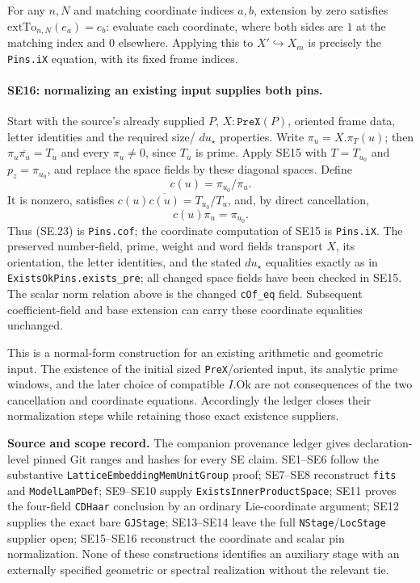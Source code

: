For any $n,N$ and matching coordinate indices $a,b$, extension by
zero satisfies $\mathrm{extTo}_{n,N}(e_a)=e_b$: evaluate each
coordinate, where both sides are $1$ at the matching index and $0$
elsewhere. Applying this to $X'\hookrightarrow X_m$ is precisely
the \texttt{Pins.iX} equation, with its fixed frame indices.

\paragraph{SE16: normalizing an existing input supplies both pins.}
Start with the source's already supplied $P$, $X:\texttt{PreX}(P)$,
oriented frame data, letter identities and the required size/
$du_\star$ properties. Write $\pi_u=X.\pi_T(u)$; then
$\pi_u\overline{\pi_u}=T_u$ and every $\pi_u\ne0$, since $T_u$
is prime. Apply SE15 with $T=T_{u_0}$ and $p_z=\pi_{u_0}$, and
replace the space fields by these diagonal spaces. Define
\[
 c(u)=\pi_{u_0}/\pi_u.
 \tag{SE.22}
\]
It is nonzero, satisfies
$c(u)\overline{c(u)}=T_{u_0}/T_u$, and, by direct cancellation,
\[
 c(u)\pi_u=\pi_{u_0}.
 \tag{SE.23}
\]
Thus (SE.23) is \texttt{Pins.cof}; the coordinate computation of
SE15 is \texttt{Pins.iX}. The preserved number-field, prime, weight
and word fields transport $X$, its orientation, the letter identities,
and the stated $du_\star$ equalities exactly as in
\texttt{ExistsOkPins.exists\_pre}; all changed space fields have
been checked in SE15. The scalar norm relation above is the changed
\texttt{cOf\_eq} field. Subsequent coefficient-field and base
extension can carry these coordinate equalities unchanged.

This is a normal-form construction for an existing arithmetic and
geometric input. The existence of the initial sized
\texttt{PreX}/oriented input, its analytic prime windows, and the
later choice of compatible $I.\mathrm{Ok}$ are not consequences of
the two cancellation and coordinate equations. Accordingly the
ledger closes their normalization steps while retaining those exact
existence suppliers.

\medskip
\noindent\textbf{Source and scope record.}
The companion provenance ledger gives declaration-level pinned Git
ranges and hashes for every SE claim. SE1--SE6 follow the substantive
\texttt{LatticeEmbeddingMemUnitGroup} proof; SE7--SE8 reconstruct
\texttt{fits} and \texttt{ModelLamPDef}; SE9--SE10 supply
\texttt{ExistsInnerProductSpace}; SE11 proves the four-field
\texttt{CDHaar} conclusion by an ordinary Lie-coordinate argument;
SE12 supplies the exact bare \texttt{GJStage}; SE13--SE14 leave the
full \texttt{NStage}/\texttt{LocStage} supplier open; SE15--SE16
reconstruct the coordinate and scalar pin normalization. None of
these constructions identifies an auxiliary stage with an externally
specified geometric or spectral realization without the relevant tie.
